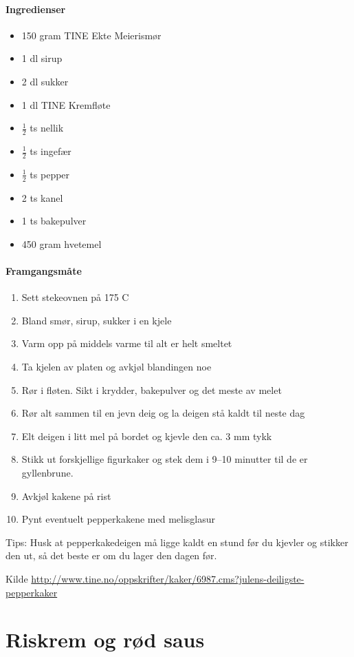\documentclass[12pt,a4paper]{book}
\begin{document}
{\paragraph{Ingredienser}
\begin{itemize}[noitemsep]
	\item 150 gram TINE Ekte Meierismør
	\item 1 dl sirup
	\item 2 dl sukker
	\item 1 dl TINE Kremfløte
	\item $\frac{1}{2}$ ts nellik
	\item $\frac{1}{2}$ ts ingefær
	\item $\frac{1}{2}$ ts pepper
	\item 2 ts kanel
	\item 1 ts bakepulver
	\item 450 gram hvetemel
\end{itemize}

\paragraph{Framgangsmåte}
\begin{enumerate}[noitemsep]
	\item Sett stekeovnen på 175 \degree C
	\item Bland smør, sirup, sukker i en kjele
	\item Varm opp på middels varme til alt er helt smeltet
	\item Ta kjelen av platen og avkjøl blandingen noe
	\item Rør i fløten. Sikt i krydder, bakepulver og det meste av melet
	\item Rør alt sammen til en jevn deig og la deigen stå kaldt til neste dag
	\item Elt deigen i litt mel på bordet og kjevle den ca. 3 mm tykk
	\item Stikk ut forskjellige figurkaker og stek dem i 9--10 minutter til de er gyllenbrune.
	\item Avkjøl kakene på rist
	\item Pynt eventuelt pepperkakene med melisglasur
\end{enumerate}



Tips: Husk at pepperkakedeigen må ligge kaldt en stund før du kjevler og stikker den ut, så det beste er om du lager den dagen før.

Kilde \url{http://www.tine.no/oppskrifter/kaker/6987.cms?julens-deiligste-pepperkaker}
\clearpage{}
\clearpage{}\section{﻿Riskrem og rød saus}
\label{riskrem}

}
\end{document}
